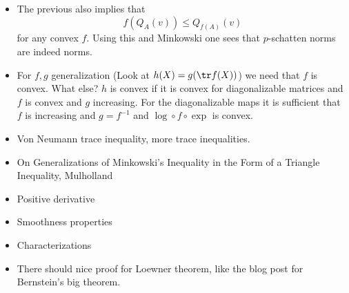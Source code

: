 \begin{itemize}
	\item The previous also implies that
	\[
		f(Q_{A}(v)) \leq Q_{f(A)}(v)
	\]
	for any convex $f$. Using this and Minkowski one sees that $p$-schatten norms are indeed norms.
	\item For $f, g$ generalization (Look at $h(X) = g (\tr f(X))$) we need that $f$ is convex. What else? $h$ is convex if it is convex for diagonalizable matrices and $f$ is convex and $g$ increasing. For the diagonalizable maps it is sufficient that $f$ is increasing and $g = f^{-1}$ and $\log \circ f \circ \exp$ is convex.
	\item Von Neumann trace inequality, more trace inequalities.
	\item On Generalizations of Minkowski's Inequality in the Form of a Triangle Inequality, Mulholland
	\item Positive derivative
	\item Smoothness properties
	\item Characterizations
	\item There should nice proof for Loewner theorem, like the blog post for Bernstein's big theorem.
\end{itemize}
